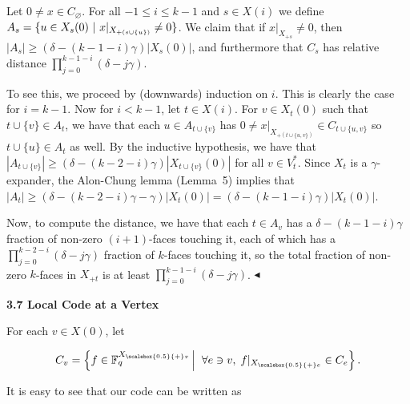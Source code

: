 Let $0\not=x\in C_{\varnothing}$. For all $-1\leq i\leq k-1$ and $s\in X(i)$ we define $A_{s}=\{u\in X_{s}(0)\nobreak\ |\nobreak\ x|_{X_{+(s\cup\{u\})}}\not=0\}$. We claim that if $x|_{X_{+s}}\not=0$, then $|A_{s}|\geq\left(\delta-(k-1-i)\gamma\right)|X_{s}(0)|$, and furthermore that $C_{s}$ has relative distance $\prod_{j=0}^{k-1-i}(\delta-j\gamma)$.\par




To see this, we proceed by (downwards) induction on $i$. This is clearly the case for $i=k-1$. Now for $i<k-1$, let $t\in X(i)$. For $v\in X_{t}(0)$ such that $t\cup\{v\}\in A_{t}$, we have that each $u\in A_{t\cup\{v\}}$ has $0\not=x|_{X_{+(t\cup\{u,v\})}}\in C_{t\cup\{u,v\}}$ so $t\cup\{u\}\in A_{t}$ as well. By the inductive hypothesis, we have that $|A_{t\cup\{v\}}|\geq(\delta-(k-2-i)\gamma)|X_{t\cup\{v\}}(0)|$ for all $v\in V^{*}_{t}$. Since $X_{t}$ is a $\gamma$-expander, the Alon-Chung lemma (Lemma 5) implies that $|A_{t}|\geq(\delta-(k-2-i)\gamma-\gamma)|X_{t}(0)|=(\delta-(k-1-i)\gamma)|X_{t}(0)|$.\par




Now, to compute the distance, we have that each $t\in A_{v}$ has a $\delta-(k-1-i)\gamma$ fraction of non-zero $(i+1)$-faces touching it, each of which has a $\prod_{j=0}^{k-2-i}(\delta-j\gamma)$ fraction of $k$-faces touching it, so the total fraction of non-zero $k$-faces in $X_{+t}$ is at least $\prod_{j=0}^{k-1-i}(\delta-j\gamma)$.
$\blacktriangleleft$\par






\par\medskip\noindent\textbf{
3.7 Local Code at a Vertex}\par




For each $v\in X(0)$, let\par


\[\begin{gathered}
C_{v}=\left\{f\in\mathbb{F}_{q}^{{X}_{\scalebox{0.5}{+}v}}\left|\;\vphantom{f\in\mathbb{F}_{q}^{{X}_{\scalebox{0.5}{+}v}}\forall e\ni v,\;f|_{{X}_{\scalebox{0.5}{+}e}}\in C_{e}}\right.\forall e\ni v,\;f|_{{X}_{\scalebox{0.5}{+}e}}\in C_{e}\right\}.
\end{gathered}\]


It is easy to see that our code can be written as\par


